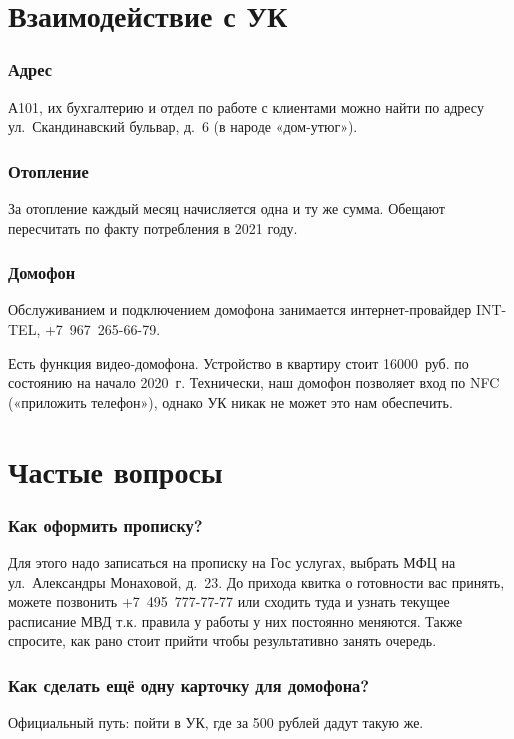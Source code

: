 \documentclass[10pt,landscape,a4paper]{article}
\begin{document}
\begin{multicols*}{3}
  \vfill\null
  \columnbreak
  
  \section*{Взаимодействие с УК}
  \subsubsection*{Адрес}
  А101, их бухгалтерию и отдел по работе с клиентами можно найти по адресу ул.~Скандинавский бульвар, д.~6 (в народе «дом-утюг»).
  
  \subsubsection*{Отопление}
  За отопление каждый месяц начисляется одна и ту же сумма. Обещают пересчитать по факту потребления в 2021 году.

  \subsubsection*{Домофон}
  Обслуживанием и подключением домофона занимается интернет-провайдер INT-TEL, +7~967~265-66-79.

  Есть функция видео-домофона. Устройство в квартиру стоит 16000~руб. по состоянию на начало 2020~г. Технически, наш домофон позволяет вход
  по NFC («приложить телефон»), однако УК никак не может это нам обеспечить.

  \vfill\null
  \columnbreak

  \section*{Частые вопросы}
  \subsubsection*{Как оформить прописку?}

  Для этого надо записаться на прописку на Гос услугах, выбрать МФЦ на ул.~Александры Монаховой, д.~23. До прихода квитка о готовности вас
  принять, можете позвонить +7~495~777-77-77 или сходить туда и узнать текущее расписание МВД т.к. правила у работы у них постоянно
  меняются. Также спросите, как рано стоит прийти чтобы результативно занять очередь.

  \subsubsection*{Как сделать ещё одну карточку для домофона?}
  Официальный путь: пойти в УК, где за 500 рублей дадут такую же.


\end{multicols*}
\end{document}
